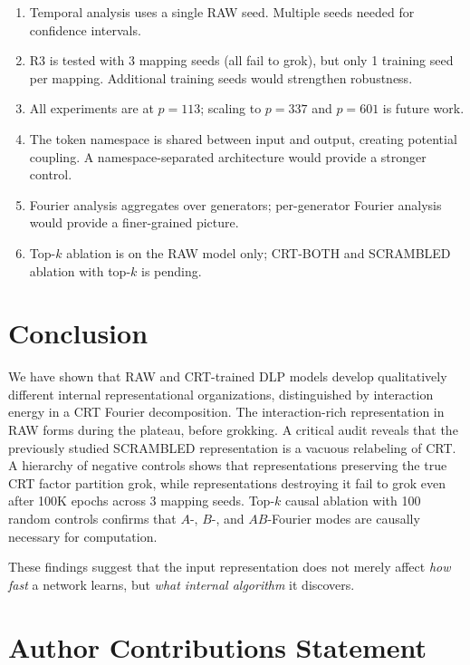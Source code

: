 \documentclass[11pt,a4paper]{article}
\theoremstyle{definition}
\theoremstyle{remark}
\begin{document}
\begin{enumerate}[leftmargin=*]
    \item Temporal analysis uses a single RAW seed. Multiple seeds needed for confidence intervals.
    \item R3 is tested with 3 mapping seeds (all fail to grok), but only 1 training seed per mapping. Additional training seeds would strengthen robustness.
    \item All experiments are at $p=113$; scaling to $p=337$ and $p=601$ is future work.
    \item The token namespace is shared between input and output, creating potential coupling. A namespace-separated architecture would provide a stronger control.
    \item Fourier analysis aggregates over generators; per-generator Fourier analysis would provide a finer-grained picture.
    \item Top-$k$ ablation is on the RAW model only; CRT-BOTH and SCRAMBLED ablation with top-$k$ is pending.
\end{enumerate}

\section{Conclusion}

We have shown that RAW and CRT-trained DLP models develop qualitatively different internal representational organizations, distinguished by interaction energy in a CRT Fourier decomposition. The interaction-rich representation in RAW forms during the plateau, before grokking. A critical audit reveals that the previously studied SCRAMBLED representation is a vacuous relabeling of CRT. A hierarchy of negative controls shows that representations preserving the true CRT factor partition grok, while representations destroying it fail to grok even after 100K epochs across 3 mapping seeds. Top-$k$ causal ablation with 100 random controls confirms that $A$-, $B$-, and $AB$-Fourier modes are causally necessary for computation.

These findings suggest that the input representation does not merely affect \emph{how fast} a network learns, but \emph{what internal algorithm} it discovers.

\section*{Author Contributions Statement}
\end{document}
